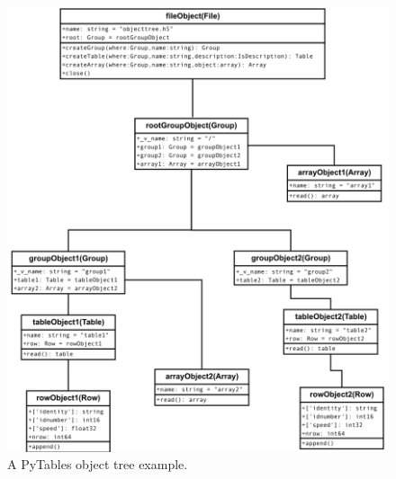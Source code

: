 \begin{figure}
\begin{center}
\includegraphics[scale=0.4]{figures/objecttree.png}
\caption{A PyTables object tree example.}
\label{objecttree}
\end{center}
\end{figure}
